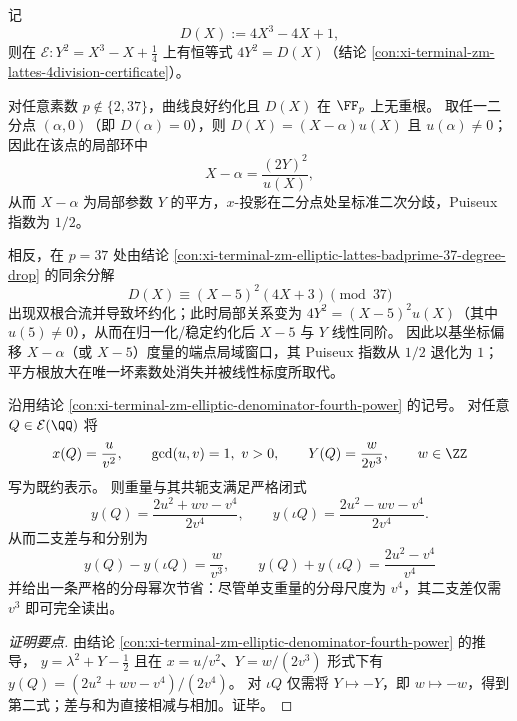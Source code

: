 \begin{conclusion}[坏约化处的分歧指数跃迁：二分点平方根统一化在 \(p=37\) 处线性化]\label{con:xi-terminal-zm-bad-reduction-puiseux-exponent-jump}
记
\[
D(X):=4X^{3}-4X+1,
\]
则在 \(\mathcal{E}:Y^{2}=X^{3}-X+\tfrac14\) 上有恒等式 \(4Y^{2}=D(X)\)（结论 \ref{con:xi-terminal-zm-lattes-4division-certificate}）。
\par
对任意素数 \(p\notin\{2,37\}\)，曲线良好约化且 \(D(X)\) 在 \(\FF_p\) 上无重根。
取任一二分点 \((\alpha,0)\)（即 \(D(\alpha)=0\)），则 \(D(X)=(X-\alpha)u(X)\) 且 \(u(\alpha)\neq 0\)；
因此在该点的局部环中
\[
X-\alpha=\frac{(2Y)^{2}}{u(X)},
\]
从而 \(X-\alpha\) 为局部参数 \(Y\) 的平方，\(x\)-投影在二分点处呈标准二次分歧，Puiseux 指数为 \(1/2\)。
\par
相反，在 \(p=37\) 处由结论 \ref{con:xi-terminal-zm-elliptic-lattes-badprime-37-degree-drop} 的同余分解
\[
D(X)\equiv (X-5)^{2}(4X+3)\pmod{37}
\]
出现双根合流并导致坏约化；此时局部关系变为 \(4Y^{2}=(X-5)^{2}u(X)\)（其中 \(u(5)\neq 0\)），从而在归一化/稳定约化后 \(X-5\) 与 \(Y\) 线性同阶。
因此以基坐标偏移 \(X-\alpha\)（或 \(X-5\)）度量的端点局域窗口，其 Puiseux 指数从 \(1/2\) 退化为 \(1\)；
平方根放大在唯一坏素数处消失并被线性标度所取代。
\end{conclusion}

\begin{conclusion}\label{con:xi-terminal-zm-elliptic-weight-branch-difference-v3}
沿用结论 \ref{con:xi-terminal-zm-elliptic-denominator-fourth-power} 的记号。
对任意 \(Q\in\mathcal{E}(\QQ)\) 将
\[
x(Q)=\frac{u}{v^{2}},\qquad \gcd(u,v)=1,\ v>0,
\qquad
Y(Q)=\frac{w}{2v^{3}},\qquad w\in\ZZ
\]
写为既约表示。
则重量与其共轭支满足严格闭式
\[
y(Q)=\frac{2u^{2}+wv-v^{4}}{2v^{4}},
\qquad
y(\iota Q)=\frac{2u^{2}-wv-v^{4}}{2v^{4}}.
\]
从而二支差与和分别为
\[
\boxed{\;
y(Q)-y(\iota Q)=\frac{w}{v^{3}},\qquad
y(Q)+y(\iota Q)=\frac{2u^{2}-v^{4}}{v^{4}}\;}
\]
并给出一条严格的分母幂次节省：尽管单支重量的分母尺度为 \(v^{4}\)，其二支差仅需 \(v^{3}\) 即可完全读出。
\end{conclusion}
\begin{proof}[证明要点]
由结论 \ref{con:xi-terminal-zm-elliptic-denominator-fourth-power} 的推导，
\(
y=\lambda^{2}+Y-\tfrac12
\)
且在 \(x=u/v^{2}\)、\(Y=w/(2v^{3})\) 形式下有
\(
y(Q)=(2u^{2}+wv-v^{4})/(2v^{4})
\)。
对 \(\iota Q\) 仅需将 \(Y\mapsto -Y\)，即 \(w\mapsto -w\)，得到第二式；差与和为直接相减与相加。证毕。
\end{proof}

